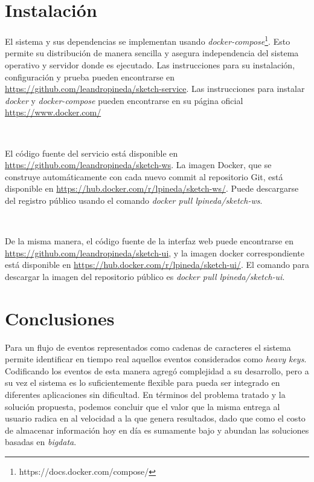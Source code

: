 \documentclass[a4paper,10pt, oneside]{article}
\begin{document}
\section{Instalación}
El sistema y sus dependencias se implementan usando \textit{docker-compose}\footnote{https://docs.docker.com/compose/}. Esto permite su distribución de manera sencilla y asegura independencia del sistema operativo y servidor donde es ejecutado. Las instrucciones para su instalación, configuración y prueba pueden encontrarse en \hyperref[https://github.com/leandropineda/sketch-service]{https://github.com/leandropineda/sketch-service}. Las instrucciones para instalar \textit{docker} y \textit{docker-compose} pueden encontrarse en su página oficial \hyperref[https://www.docker.com/]{https://www.docker.com/}

\

El código fuente del servicio está disponible en \hyperref[https://github.com/leandropineda/sketch-ws]{https://github.com/leandropineda/sketch-ws}. La imagen Docker, que se construye automáticamente con cada nuevo commit al repositorio Git, está disponible en \hyperref[https://hub.docker.com/r/lpineda/sketch-ws/]{https://hub.docker.com/r/lpineda/sketch-ws/}. Puede descargarse del registro público usando el comando \textit{docker pull lpineda/sketch-ws}.

\

De la misma manera, el código fuente de la interfaz web puede encontrarse en \hyperref[https://github.com/leandropineda/sketch-ui]{https://github.com/leandropineda/sketch-ui}, y la imagen docker correspondiente está disponible en \hyperref[https://hub.docker.com/r/lpineda/sketch-ui/]{https://hub.docker.com/r/lpineda/sketch-ui/}. El comando para descargar la imagen del repositorio público es \textit{docker pull lpineda/sketch-ui}.


\clearpage
\section{Conclusiones}
Para un flujo de eventos representados como cadenas de caracteres el sistema permite identificar en tiempo real aquellos eventos considerados como \textit{heavy keys}. Codificando los eventos de esta manera agregó complejidad a su desarrollo, pero a su vez el sistema es lo suficientemente flexible para pueda ser integrado en diferentes aplicaciones sin dificultad. En términos del problema tratado y la solución propuesta, podemos concluir que el valor que la misma entrega al usuario radica en al velocidad a la que genera resultados, dado que como el costo de almacenar información hoy en día es sumamente bajo y abundan las soluciones basadas en \textit{bigdata}.
\end{document}
